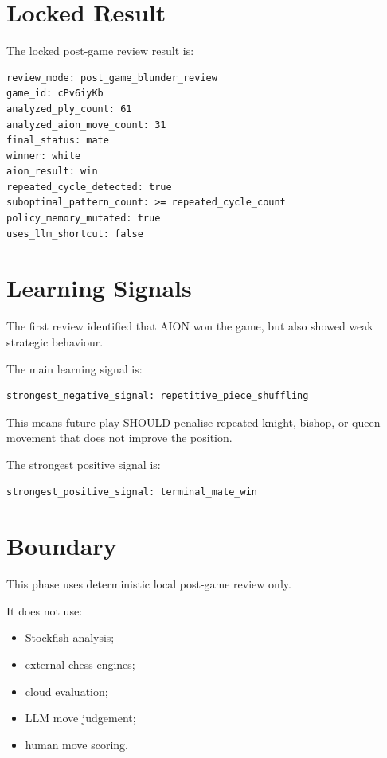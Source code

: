 \documentclass[11pt,a4paper]{article}
\begin{document}
\section{Locked Result}

The locked post-game review result is:

\begin{verbatim}
review_mode: post_game_blunder_review
game_id: cPv6iyKb
analyzed_ply_count: 61
analyzed_aion_move_count: 31
final_status: mate
winner: white
aion_result: win
repeated_cycle_detected: true
suboptimal_pattern_count: >= repeated_cycle_count
policy_memory_mutated: true
uses_llm_shortcut: false
\end{verbatim}

\section{Learning Signals}

The first review identified that AION won the game, but also showed weak strategic behaviour.

The main learning signal is:

\begin{verbatim}
strongest_negative_signal: repetitive_piece_shuffling
\end{verbatim}

This means future play SHOULD penalise repeated knight, bishop, or queen movement that does not improve the position.

The strongest positive signal is:

\begin{verbatim}
strongest_positive_signal: terminal_mate_win
\end{verbatim}

\section{Boundary}

This phase uses deterministic local post-game review only.

It does not use:

\begin{itemize}
  \item Stockfish analysis;
  \item external chess engines;
  \item cloud evaluation;
  \item LLM move judgement;
  \item human move scoring.
\end{itemize}
\end{document}
